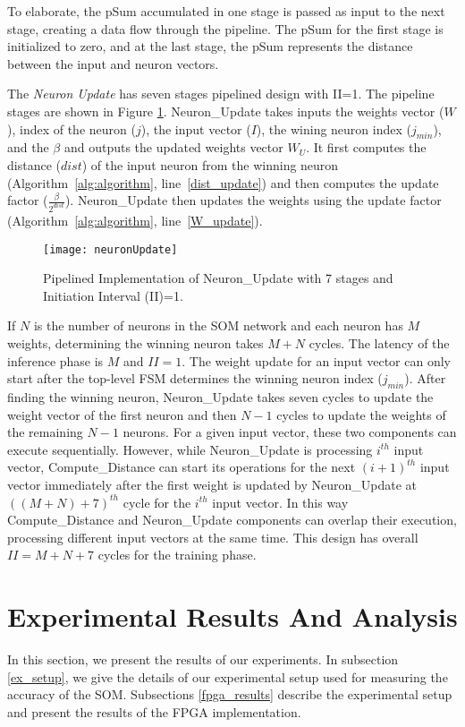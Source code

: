 To elaborate, the pSum accumulated in one stage is passed as input to the next stage, creating a data flow through the pipeline. The pSum for the first stage is initialized to zero, and at the last stage, the pSum represents the distance between the input and neuron vectors.

The \textit{Neuron Update} has seven stages pipelined design with II=1. The pipeline stages are shown in Figure \ref{fig:NeuronUpdate}. Neuron\_Update takes inputs the weights vector ($W$), index of the neuron ($j$), the input vector ($I$), the wining neuron index ($j_{min}$), and the $\beta$ and outputs the updated weights vector $W_U$. 
It first computes the distance ($dist$) of the input neuron from the winning neuron (Algorithm~\ref{alg:algorithm}, line~\ref{dist_update}) and then computes the update factor ($\frac{\beta}{2^{dist}}$). Neuron\_Update then updates the weights using the update factor (Algorithm~\ref{alg:algorithm}, line~\ref{W_update}). 
\begin{figure}[!htb]
	\centering
	\texttt{[image: neuronUpdate]}
	\caption{Pipelined Implementation of Neuron\_Update with 7 stages and Initiation Interval (II)=1.}
	\label{fig:NeuronUpdate}
\end{figure}

If $N$ is the number of neurons in the SOM network and each neuron has $M$ weights, determining the winning neuron takes $M{+}N$ cycles. The latency of the inference phase is $M$ and $II{=}1$. The weight update for an input vector can only start after the top-level FSM determines the winning neuron index ($j_{min}$). After finding the winning neuron, Neuron\_Update takes seven cycles to update the weight vector of the first neuron and then $N{-}1$ cycles to update the weights of the remaining $N{-}1$ neurons. For a given input vector, these two components can execute sequentially. However, while Neuron\_Update is processing $i^{th}$ input vector, Compute\_Distance can start its operations for the next $(i{+}1)^{th}$ input vector immediately after the first weight is updated by Neuron\_Update at $((M{+}N){+}7)^{th}$ cycle for the $i^{th}$ input vector. In this way Compute\_Distance and Neuron\_Update components can overlap their execution, processing different input vectors at the same time. This design has overall $II{=}M{+}N{+}7$ cycles for the training phase.

\section{Experimental Results And Analysis}\label{sec:results}
In this section, we present the results of our experiments. In subsection \ref{ex_setup}, we give the details of our experimental setup used for measuring the accuracy of the SOM. Subsections \ref{fpga_results} describe the experimental setup and present the results of the FPGA implementation.

